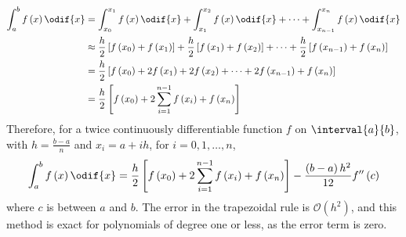 \documentclass{article}
\begin{document}
\begin{align*}
    \int_a^b f\left( x \right) \odif{x} & = \int_{x_0}^{x_1} f\left( x \right) \odif{x} + \int_{x_1}^{x_2} f\left( x \right) \odif{x} + \cdots + \int_{x_{n - 1}}^{x_n} f\left( x \right) \odif{x}                                                                                  \\
                                        & \approx \frac{h}{2} \left[ f\left( x_0 \right) + f\left( x_1 \right) \right] + \frac{h}{2} \left[ f\left( x_1 \right) + f\left( x_2 \right) \right] + \cdots + \frac{h}{2} \left[ f\left( x_{n - 1} \right) + f\left( x_n \right) \right] \\
                                        & = \frac{h}{2} \left[ f\left( x_0 \right) + 2 f\left( x_1 \right) + 2 f\left( x_2 \right) + \cdots + 2 f\left( x_{n - 1} \right) + f\left( x_n \right) \right]                                                                             \\
                                        & = \frac{h}{2} \left[ f\left( x_0 \right) + 2 \sum_{i = 1}^{n - 1} f\left( x_i \right) + f\left( x_n \right) \right]
\end{align*}
Therefore, for a twice continuously differentiable function \(f\) on
\(\interval{a}{b}\), with \(h = \frac{b - a}{n}\) and \(x_i = a + i h\),
for \(i = 0, 1, \ldots, n\),
\begin{equation*}
    \int_a^b f\left( x \right) \odif{x} = \frac{h}{2} \left[ f\left( x_0 \right) + 2 \sum_{i = 1}^{n - 1} f\left( x_i \right) + f\left( x_n \right) \right] - \frac{\left( b - a \right) h^2}{12} f''\left( c \right)
\end{equation*}
where \(c\) is between \(a\) and \(b\). The error in the trapezoidal
rule is \(\mathcal{O}\left( h^2 \right)\), and this method is exact for
polynomials of degree one or less, as the error term is zero.
\end{document}
